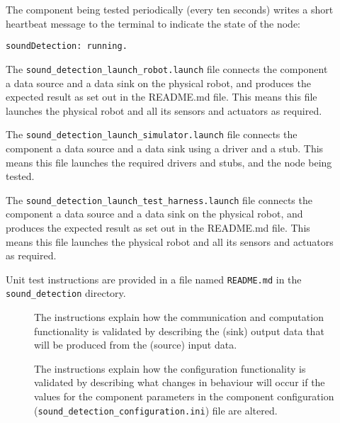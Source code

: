 \documentclass{CSSRforAfrica}
\newcommand{\checkboxChecked}{\fbox{\ding{51}}} %
\newcommand{\checkboxDashed}{\fbox{--}}         %
\begin{document}
\begin{description}
\item[\checkboxChecked]   The component being tested periodically (every ten seconds) writes a short heartbeat message to the terminal to indicate the state of the node:
{\small 
\begin{verbatim}
soundDetection: running.
\end{verbatim}}

\item[\checkboxDashed] The {\small \verb+sound_detection_launch_robot.launch+} file connects the component a data source and a data sink on the physical robot, and produces the expected result as set out in the README.md file. This means this file launches the physical robot and all its sensors and actuators as required.

\item[\checkboxDashed]   The {\small \verb+sound_detection_launch_simulator.launch+} file connects the component a data source and a data sink using a driver and a stub. This means this file launches the required drivers and stubs, and the node being tested.

\item[\checkboxDashed]   The {\small \verb+sound_detection_launch_test_harness.launch+} file connects the component a data source and a data sink on the physical robot, and produces the expected result as set out in the README.md file. This means this file launches the physical robot and all its sensors and actuators as required.

\item[\checkboxChecked] Unit test instructions are provided in a file named {\small \verb+README.md+} in the  {\small \verb+sound_detection+} directory. 


\begin{description}

\item[\checkboxChecked] The instructions explain how the communication and computation functionality is validated by describing the (sink) output data that will be produced from the (source) input data.  

\item[\checkboxChecked] The instructions explain how the configuration functionality is validated by describing what changes in behaviour will occur if the values for the component parameters in the component configuration ({\small \verb+sound_detection_configuration.ini+}) file are altered.

\end{description}

\end{description} 
\end{document}
